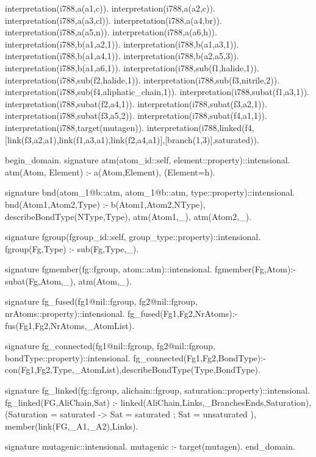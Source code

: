 \documentclass[a4,11pt]{memoir}
\begin{document}
\begin{linumcode}
interpretation(i788,a(a1,c)).
interpretation(i788,a(a2,c)).
interpretation(i788,a(a3,cl)).
interpretation(i788,a(a4,br)).
interpretation(i788,a(a5,n)).
interpretation(i788,a(a6,h)).
interpretation(i788,b(a1,a2,1)).
interpretation(i788,b(a1,a3,1)).
interpretation(i788,b(a1,a4,1)).
interpretation(i788,b(a2,a5,3)).
interpretation(i788,b(a1,a6,1)).
interpretation(i788,sub(f1,halide,1)).
interpretation(i788,sub(f2,halide,1)).
interpretation(i788,sub(f3,nitrile,2)).
interpretation(i788,sub(f4,aliphatic_chain,1)).
interpretation(i788,subat(f1,a3,1)).
interpretation(i788,subat(f2,a4,1)).
interpretation(i788,subat(f3,a2,1)).
interpretation(i788,subat(f3,a5,2)).
interpretation(i788,subat(f4,a1,1)).
interpretation(i788,target(mutagen)).
interpretation(i788,linked(f4,[link(f3,a2,a1),link(f1,a3,a1),link(f2,a4,a1)],[branch(1,3)],saturated)).
\end{linumcode}

\begin{linumcode}
begin_domain.
signature atm(atom_id::self, element::property)::intensional.
atm(Atom, Element) :-
    a(Atom,Element), \+(Element=h).

signature bnd(atom_1@b::atm, atom_1@b::atm, type::property)::intensional.
bnd(Atom1,Atom2,Type) :-
    b(Atom1,Atom2,NType), describeBondType(NType,Type), atm(Atom1,_), atm(Atom2,_).

signature fgroup(fgroup_id::self, group_type::property)::intensional.
fgroup(Fg,Type) :- sub(Fg,Type,_).

signature fgmember(fg::fgroup, atom::atm)::intensional.
fgmember(Fg,Atom):- subat(Fg,Atom,_), atm(Atom,_).

signature fg_fused(fg1@nil::fgroup, fg2@nil::fgroup, nrAtoms::property)::intensional.
fg_fused(Fg1,Fg2,NrAtoms):- fus(Fg1,Fg2,NrAtoms,_AtomList).

signature fg_connected(fg1@nil::fgroup, fg2@nil::fgroup, bondType::property)::intensional.
fg_connected(Fg1,Fg2,BondType):-
    con(Fg1,Fg2,Type,_AtomList),describeBondType(Type,BondType).

signature fg_linked(fg::fgroup, alichain::fgroup, saturation::property)::intensional.
fg_linked(FG,AliChain,Sat) :-
    linked(AliChain,Links,_BranchesEnds,Saturation),
    (Saturation = saturated ->
     Sat = saturated
    ;
     Sat = unsaturated
    ),
    member(link(FG,_A1,_A2),Links).

signature mutagenic::intensional.
mutagenic :- target(mutagen).
end_domain.
\end{linumcode}
\end{document}

